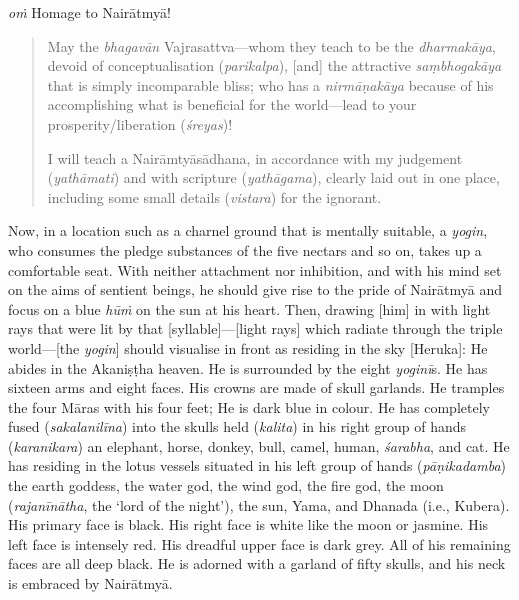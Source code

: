 \documentclass[naipra.tex]{subfiles}
\begin{document}
\noindent \emph{oṁ} Homage to Nairātmyā!

\begin{quote}
	May the \emph{bhagavān} Vajrasattva—whom they teach to be the \emph{dharmakāya}, devoid of conceptualisation (\emph{parikalpa}), [and] the attractive \emph{saṃbhogakāya} that is simply incomparable bliss; who has a \emph{nirmāṇakāya} because of his accomplishing what is beneficial for the world—lead to your prosperity/liberation (\emph{śreyas})!

	I will teach a Nairāmtyāsādhana, in accordance with my judgement (\emph{yathāmati}) and with scripture (\emph{yathāgama}), clearly laid out in one place, including some small details (\emph{vistara}) for the ignorant.
\end{quote}

Now, in a location such as a charnel ground that is mentally suitable, a \emph{yogin}, who consumes the pledge substances of the five nectars and so on, takes up a comfortable seat.
With neither attachment nor inhibition, and with his mind set on the aims of sentient beings, he should give rise to the pride of Nairātmyā and focus on a blue \emph{hūṁ} on the sun at his heart.
Then, drawing [him] in with light rays that were lit by that [syllable]—[light rays] which radiate through the triple world—[the \emph{yogin}] should visualise in front as residing in the sky [Heruka]:
He abides in the Akaniṣṭha heaven.
He is surrounded by the eight \emph{yoginī}s.
He has sixteen arms and eight faces.
His crowns are made of skull garlands.
He tramples the four Māras with his four feet;
He is dark blue in colour.
He has completely fused (\emph{sakalanilīna}) into the skulls held (\emph{kalita}) in his right group of hands (\emph{karanikara}) an elephant, horse, donkey, bull, camel, human, \emph{śarabha}, and cat.
He has residing in the lotus vessels situated in his left group of hands (\emph{pāṇikadamba}) the earth goddess, the water god, the wind god, the fire god, the moon (\emph{rajanīnātha}, the `lord of the night'), the sun, Yama, and Dhanada (i.e., Kubera).
His primary face is black.
His right face is white like the moon or jasmine. 
His left face is intensely red.
His dreadful upper face is dark grey.
All of his remaining faces are all deep black.
He is adorned with a garland of fifty skulls, and his neck is embraced by Nairātmyā. 
\end{document}
